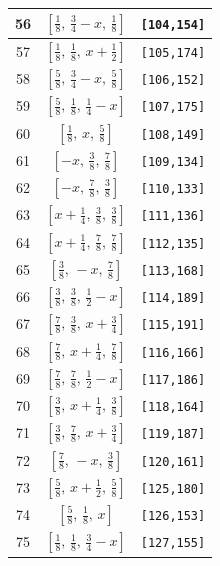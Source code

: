 \documentclass[fleqn,8pt]{jsarticle}
\begin{document}
\begin{longtable}{ccc}
56 & $\left[ \frac{1}{8},\, \frac{3}{4} - x,\, \frac{1}{8} \right]$ & {\tt [104,154]} \\ \hline
57 & $\left[ \frac{1}{8},\, \frac{1}{8},\, x + \frac{1}{2} \right]$ & {\tt [105,174]} \\ \hline
58 & $\left[ \frac{5}{8},\, \frac{3}{4} - x,\, \frac{5}{8} \right]$ & {\tt [106,152]} \\ \hline
59 & $\left[ \frac{5}{8},\, \frac{1}{8},\, \frac{1}{4} - x \right]$ & {\tt [107,175]} \\ \hline
60 & $\left[ \frac{1}{8},\, x,\, \frac{5}{8} \right]$ & {\tt [108,149]} \\ \hline
61 & $\left[ - x,\, \frac{3}{8},\, \frac{7}{8} \right]$ & {\tt [109,134]} \\ \hline
62 & $\left[ - x,\, \frac{7}{8},\, \frac{3}{8} \right]$ & {\tt [110,133]} \\ \hline
63 & $\left[ x + \frac{1}{4},\, \frac{3}{8},\, \frac{3}{8} \right]$ & {\tt [111,136]} \\ \hline
64 & $\left[ x + \frac{1}{4},\, \frac{7}{8},\, \frac{7}{8} \right]$ & {\tt [112,135]} \\ \hline
65 & $\left[ \frac{3}{8},\, - x,\, \frac{7}{8} \right]$ & {\tt [113,168]} \\ \hline
66 & $\left[ \frac{3}{8},\, \frac{3}{8},\, \frac{1}{2} - x \right]$ & {\tt [114,189]} \\ \hline
67 & $\left[ \frac{7}{8},\, \frac{3}{8},\, x + \frac{3}{4} \right]$ & {\tt [115,191]} \\ \hline
68 & $\left[ \frac{7}{8},\, x + \frac{1}{4},\, \frac{7}{8} \right]$ & {\tt [116,166]} \\ \hline
69 & $\left[ \frac{7}{8},\, \frac{7}{8},\, \frac{1}{2} - x \right]$ & {\tt [117,186]} \\ \hline
70 & $\left[ \frac{3}{8},\, x + \frac{1}{4},\, \frac{3}{8} \right]$ & {\tt [118,164]} \\ \hline
71 & $\left[ \frac{3}{8},\, \frac{7}{8},\, x + \frac{3}{4} \right]$ & {\tt [119,187]} \\ \hline
72 & $\left[ \frac{7}{8},\, - x,\, \frac{3}{8} \right]$ & {\tt [120,161]} \\ \hline
73 & $\left[ \frac{5}{8},\, x + \frac{1}{2},\, \frac{5}{8} \right]$ & {\tt [125,180]} \\ \hline
74 & $\left[ \frac{5}{8},\, \frac{1}{8},\, x \right]$ & {\tt [126,153]} \\ \hline
75 & $\left[ \frac{1}{8},\, \frac{1}{8},\, \frac{3}{4} - x \right]$ & {\tt [127,155]} \\ \hline

\end{longtable}
\end{document}
